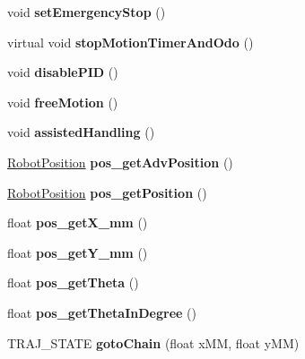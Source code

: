 \begin{DoxyCompactItemize}
\item 
\mbox{\label{classAsserv_a312602d6bf6f8591937e4d0003497bbb}} 
void {\bfseries set\+Emergency\+Stop} ()
\item 
\mbox{\label{classAsserv_af3ac6ea471cb2fb8713ce32bbc05d66e}} 
virtual void {\bfseries stop\+Motion\+Timer\+And\+Odo} ()
\item 
\mbox{\label{classAsserv_aa8b9209374a094acf3242d732cdeee5e}} 
void {\bfseries disable\+P\+ID} ()
\item 
\mbox{\label{classAsserv_aef3c037b15172c4cc015c47a33f93634}} 
void {\bfseries free\+Motion} ()
\item 
\mbox{\label{classAsserv_a2d4c545965ac32ef54c9b118d3576655}} 
void {\bfseries assisted\+Handling} ()
\item 
\mbox{\label{classAsserv_a7b4da229e99922c338cef82d645875d6}} 
\hyperlink{structRobotPosition}{Robot\+Position} {\bfseries pos\+\_\+get\+Adv\+Position} ()
\item 
\mbox{\label{classAsserv_a91bb1a510149cf8bc30ec40848732eaa}} 
\hyperlink{structRobotPosition}{Robot\+Position} {\bfseries pos\+\_\+get\+Position} ()
\item 
\mbox{\label{classAsserv_a871088db63d1a0e20ccbf387c6f895db}} 
float {\bfseries pos\+\_\+get\+X\+\_\+mm} ()
\item 
\mbox{\label{classAsserv_a2cca6401ccf8cfc7cc927177cba14f4a}} 
float {\bfseries pos\+\_\+get\+Y\+\_\+mm} ()
\item 
\mbox{\label{classAsserv_a11fc2df956a191f42ab34088a7ae9ce0}} 
float {\bfseries pos\+\_\+get\+Theta} ()
\item 
\mbox{\label{classAsserv_a0c1a1048174322c00dfba79c74193bd1}} 
float {\bfseries pos\+\_\+get\+Theta\+In\+Degree} ()
\item 
\mbox{\label{classAsserv_a8d3855dc9eddaff07b58a7a01e2024c3}} 
T\+R\+A\+J\+\_\+\+S\+T\+A\+TE {\bfseries goto\+Chain} (float x\+MM, float y\+MM)

\end{DoxyCompactItemize}
